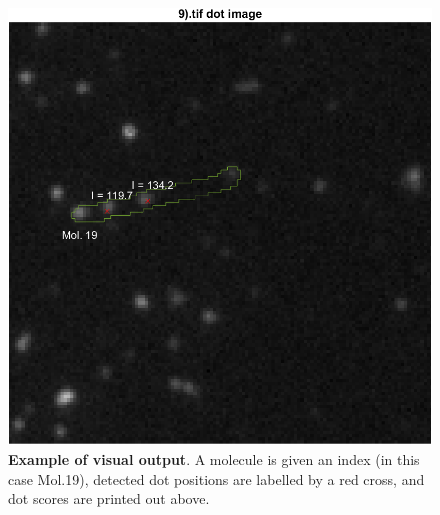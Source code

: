 \documentclass{article}
\begin{document}
\begin{figure}
		\includegraphics{image.png}
		\caption{{\bf Example of visual output}. A molecule is given an index (in this case Mol.19), detected dot positions are labelled by a red cross, and dot scores are printed out above.}
\end{figure}

\end{document}
